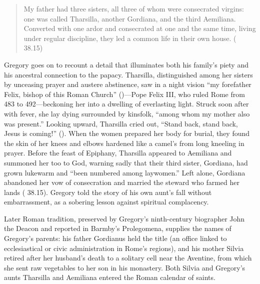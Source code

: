 \begin{quote}
My father had three sisters, all three of whom were consecrated virgins: one
was called Tharsilla, another Gordiana, and the third Aemiliana. Converted with
one ardor and consecrated at one and the same time, living under regular
discipline, they led a common life in their own house. ( 38.15)
\end{quote}

Gregory goes on to recount a detail that illuminates both his family's piety
and his ancestral connection to the papacy. Tharsilla, distinguished among her
sisters by unceasing prayer and austere abstinence, saw in a night vision
``my forefather Felix, bishop of this Roman Church'' ()---Pope Felix III, who ruled Rome from 483 to
492---beckoning her into a dwelling of everlasting light. Struck soon after
with fever, she lay dying surrounded by kinsfolk, ``among whom my mother also
was present.'' Looking upward, Tharsilla cried out, ``Stand back, stand back,
Jesus is coming!'' (). When the women
prepared her body for burial, they found the skin of her knees and elbows
hardened like a camel's from long kneeling in prayer. Before the feast of
Epiphany, Tharsilla appeared to Aemiliana and summoned her too to God, warning
sadly that their third sister, Gordiana, had grown lukewarm and ``been numbered
among laywomen.'' Left alone, Gordiana abandoned her vow of consecration and
married the steward who farmed her lands ( 38.15).
Gregory told the story of his own aunt's fall without embarrassment, as a
sobering lesson against spiritual complacency.

Later Roman tradition, preserved by Gregory's ninth-century biographer John the
Deacon and reported in Barmby's Prolegomena, supplies the names of Gregory's
parents: his father Gordianus held the title  (an office
linked to ecclesiastical or civic administration in Rome's regions), and his
mother Silvia retired after her husband's death to a solitary cell near the
Aventine, from which she sent raw vegetables to her son in his monastery. Both
Silvia and Gregory's aunts Tharsilla and Aemiliana entered the Roman calendar
of saints.


